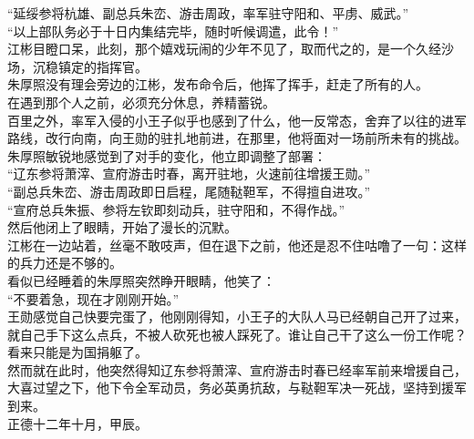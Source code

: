 \begin{multicols}{\theparacolNo}
“延绥参将杭雄、副总兵朱峦、游击周政，率军驻守阳和、平虏、威武。”\\

“以上部队务必于十日内集结完毕，随时听候调遣，此令！”\\

江彬目瞪口呆，此刻，那个嬉戏玩闹的少年不见了，取而代之的，是一个久经沙场，沉稳镇定的指挥官。\\

朱厚照没有理会旁边的江彬，发布命令后，他挥了挥手，赶走了所有的人。\\

在遇到那个人之前，必须充分休息，养精蓄锐。\\

百里之外，率军入侵的小王子似乎也感到了什么，他一反常态，舍弃了以往的进军路线，改行向南，向王勋的驻扎地前进，在那里，他将面对一场前所未有的挑战。\\

朱厚照敏锐地感觉到了对手的变化，他立即调整了部署：\\

“辽东参将萧滓、宣府游击时春，离开驻地，火速前往增援王勋。”\\

“副总兵朱峦、游击周政即日启程，尾随鞑靼军，不得擅自进攻。”\\

“宣府总兵朱振、参将左钦即刻动兵，驻守阳和，不得作战。”\\

然后他闭上了眼睛，开始了漫长的沉默。\\

江彬在一边站着，丝毫不敢吱声，但在退下之前，他还是忍不住咕噜了一句：这样的兵力还是不够的。\\

看似已经睡着的朱厚照突然睁开眼睛，他笑了：\\

“不要着急，现在才刚刚开始。”\\

王勋感觉自己快要完蛋了，他刚刚得知，小王子的大队人马已经朝自己开了过来，就自己手下这么点兵，不被人砍死也被人踩死了。谁让自己干了这么一份工作呢？看来只能是为国捐躯了。\\

然而就在此时，他突然得知辽东参将萧滓、宣府游击时春已经率军前来增援自己，大喜过望之下，他下令全军动员，务必英勇抗敌，与鞑靼军决一死战，坚持到援军到来。\\

正德十二年十月，甲辰。\\


\end{multicols}
